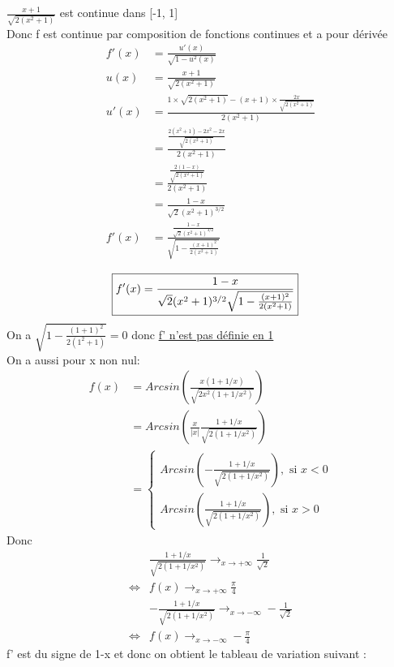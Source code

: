 \documentclass{article}
\begin{document}
\noindent
\(\frac{x+1}{\sqrt{2(x^2+1)}}\) est continue dans [-1, 1]\\
Donc f est continue par composition de fonctions continues et a pour dérivée 
\begin{align*}
    f'(x) &= \frac{u'(x)}{\sqrt{1-u^2(x)}}\\
    u(x) &= \frac{x+1}{\sqrt{2(x^2+1)}}\\
    u'(x) &= \frac{1\times \sqrt{2(x^2+1)} - (x+1)\times \frac{2x}{\sqrt{2(x^2+1)}}}{2(x^2+1)}\\
    &= \frac{\frac{2(x^2+1)-2x^2-2x}{\sqrt{2(x^2+1)}}}{2(x^2+1)}\\
    &= \frac{\frac{2(1-x)}{\sqrt{2(x^2+1)}}}{2(x^2+1)}\\
    &= \frac{1-x}{\sqrt{2}(x^2+1)^{3/2}}\\
    f'(x) &=  \frac{\frac{1-x}{\sqrt{2}(x^2+1)^{3/2}}}{\sqrt{1-\frac{(x+1)^2}{2(x^2+1)}}}\\
\end{align*}
\begin{align*}
    \Aboxed{f'(x) &= \frac{1-x}{\sqrt{2}(x^2+1)^{3/2}\sqrt{1-\frac{(x+1)^2}{2(x^2+1)}}}}
\end{align*}
\noindent
On a \(\sqrt{1-\frac{(1+1)^2}{2(1^2+1)}} = 0\) donc \underline{f' n'est pas définie en 1}\\
On a aussi pour x non nul: 
\begin{align*}
    f(x) &= Arcsin(\frac{x(1+1/x)}{\sqrt{2x^2(1+1/x^2)}})\\
    &= Arcsin(\frac{x}{|x|} \frac{1+1/x}{\sqrt{2(1+1/x^2)}})\\
    &= \begin{cases*}
        Arcsin(-\frac{1+1/x}{\sqrt{2(1+1/x^2)}}), \text{ si }x < 0\\
        Arcsin(\frac{1+1/x}{\sqrt{2(1+1/x^2)}}), \text{ si } x > 0
    \end{cases*}
\end{align*}
Donc \begin{align*}
    &\frac{1+1/x}{\sqrt{2(1+1/x^2)}} \to_{x\to +\infty} \frac{1}{\sqrt{2}}\\
    \Leftrightarrow &f(x) \to_{x\to +\infty} \frac{\pi}{4}\\
    &-\frac{1+1/x}{\sqrt{2(1+1/x^2)}} \to_{x\to -\infty} -\frac{1}{\sqrt{2}}\\
    \Leftrightarrow &f(x) \to_{x\to -\infty} -\frac{\pi}{4}
\end{align*}
\noindent
f' est du signe de 1-x et donc on obtient le tableau de variation suivant :\\
\end{document}
